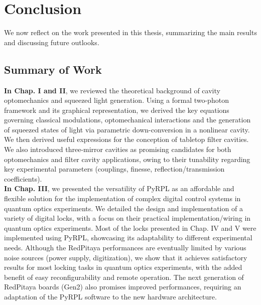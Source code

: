 \chapter*{Conclusion}\label{chap:conclusion}
\mtcaddchapter
{} %
\vspace{-0.5cm}

We now reflect on the work presented in this thesis, summarizing the main results and discussing future outlooks.

\section*{Summary of Work}

\noindent \textbf{In Chap. I and II}, we reviewed the theoretical background of cavity optomechanics and squeezed light generation. Using a formal two-photon framework and its graphical representation, we derived the key equations governing classical modulations, optomechanical interactions and the generation of squeezed states of light via parametric down-conversion in a nonlinear cavity. We then derived useful expressions for the conception of tabletop filter cavities. We also introduced three-mirror cavities as promising candidates for both optomechanics and filter cavity applications, owing to their tunability regarding key experimental parameters (couplings, finesse, reflection/transmission coefficients). \\ 

\noindent \textbf{In Chap. III}, we presented the versatility of PyRPL as an affordable and flexible solution for the implementation of complex digital control systems in quantum optics experiments. We detailed the design and implementation of a variety of digital locks, with a focus on their practical implementation/wiring in quantum optics experiments. Most of the locks presented in Chap. IV and V were implemented using PyRPL, showcasing its adaptability to different experimental needs. Although the RedPitaya performances are eventually limited by various noise sources (power supply, digitization), we show that it achieves satisfactory results for most locking tasks in quantum optics experiments, with the added benefit of easy reconfigurability and remote operation. The next generation of RedPitaya boards (Gen2) also promises improved performances, requiring an adaptation of the PyRPL software to the new hardware architecture. \\

